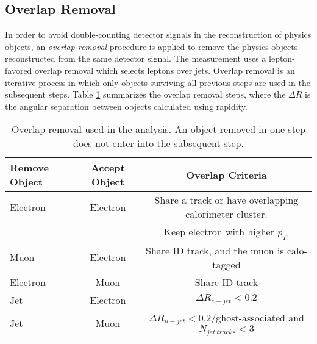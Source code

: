 \subsection{Overlap Removal}
\label{subsec:OR}

In order to avoid double-counting detector signals in the reconstruction of physics objects, an \textit{overlap removal} procedure is applied to remove the physics objects reconstructed from the same detector signal. The measurement uses a lepton-favored overlap removal which selects leptons over jets. Overlap removal is an iterative process in which only objects surviving all previous steps are used in the subsequent steps. Table \ref{tab:overlap_removal} summarizes the overlap removal steps, where the $\Delta R$ is the angular separation between objects calculated using rapidity.

\begin{table}[ht]
    \centering
        \caption{Overlap removal used in the analysis. An object removed in one step does not enter into the subsequent step. \label{tab:overlap_removal}}
        \begin{tabular}{|| l || c | c ||}
        \hline
        Remove Object & Accept Object & Overlap Criteria \\
        \hline\hline
        Electron & Electron & Share a track or have overlapping calorimeter cluster.\\
                &       & Keep electron with higher $p_{T}~$\\
        \hline
        Muon & Electron & Share ID track, and the muon is calo-tagged\\
        \hline
        Electron & Muon & Share ID track\\
        \hline
        Jet & Electron & $\Delta R_{e-jet} < 0.2$ \\
        \hline 
        Jet & Muon & $\Delta R_{\mu-jet} < 0.2/$ghost-associated and $N_{jet~tracks} < 3$\\
        \hline
    \end{tabular}
\end{table}